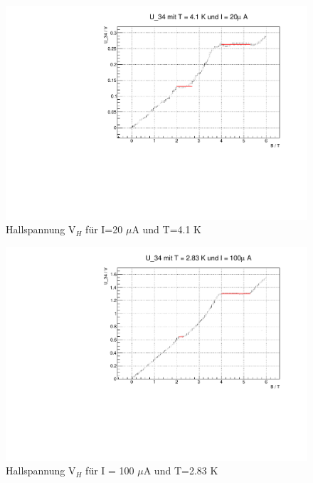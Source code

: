 \begin{figure}
\label{}
\centering
\includegraphics[scale = 0.5]{../plots/U_34_20muA_4100mK.pdf}
\caption{Hallspannung $\text{V}_H$ für I=20 $\mu$A und T=4.1 K}
\end{figure}


\begin{figure}
\label{}
\centering
\includegraphics[scale = 0.5]{../plots/U_34_100muA_2830mK.pdf}
\caption{Hallspannung $\text{V}_H$ für I = 100 $\mu$A und T=2.83 K}
\end{figure}



